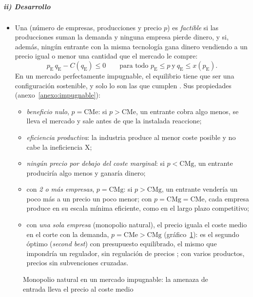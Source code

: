 \documentclass[11pt]{article}
\begin{document}
\subparagraph{ii) Desarrollo}

\begin{itemize}
\item Una  (número de empresas, producciones y precio $p$) es \emph{factible} si las producciones suman la demanda y ninguna empresa pierde dinero, y  si, además, ningún entrante con la misma tecnología gana dinero vendiendo a un precio igual o menor una cantidad que el mercado le compre:
  \[
  p_{\mathrm E}\,q_{\mathrm E}-C(q_{\mathrm E})\leq 0\qquad\text{para todo } p_{\mathrm E}\leq p\ \text{y}\ q_{\mathrm E}\leq x(p_{\mathrm E}).
  \]
  En un mercado perfectamente impugnable, el equilibrio tiene que ser una configuración sostenible, y solo lo son las que cumplen
\nocite{BaumolPanzarWillig1982Contestable}. Sus propiedades (anexo~\ref{anexo:impugnable}):
  \begin{itemize}
  \item \emph{beneficio nulo}, $p=\mathrm{CMe}$: si $p>\mathrm{CMe}$, un entrante cobra algo menos, se lleva el mercado y sale antes de que la instalada reaccione;
  \item \emph{eficiencia productiva}: la industria produce al menor coste posible y no cabe la ineficiencia X;
  \item \emph{ningún precio por debajo del coste marginal}: si $p<\mathrm{CMg}$, un entrante produciría algo menos y ganaría dinero;
  \item con \emph{2 o más empresas}, $p=\mathrm{CMg}$: si $p>\mathrm{CMg}$, un entrante vendería un poco más a un precio un poco menor; con $p=\mathrm{CMg}=\mathrm{CMe}$, cada empresa produce en su escala mínima eficiente, como en el largo plazo competitivo;
  \item con \emph{una sola empresa} (monopolio natural), el precio iguala el coste medio en el corte con la demanda, $p=\mathrm{CMe}>\mathrm{CMg}$ (gráfico~\ref{fig:impugnables}): es el segundo óptimo (\emph{second best}) con presupuesto equilibrado, el mismo que impondría un regulador, sin regulación de precios  ; con varios productos, precios sin subvenciones cruzadas\nocite{BaumolBaileyWillig1977Weak}.
  \end{itemize}
\end{itemize}

\begin{figure}[H]
\centering
\caption{Monopolio natural en un mercado impugnable: la amenaza de entrada lleva el precio al coste medio}\label{fig:impugnables}
\end{figure}
\end{document}
